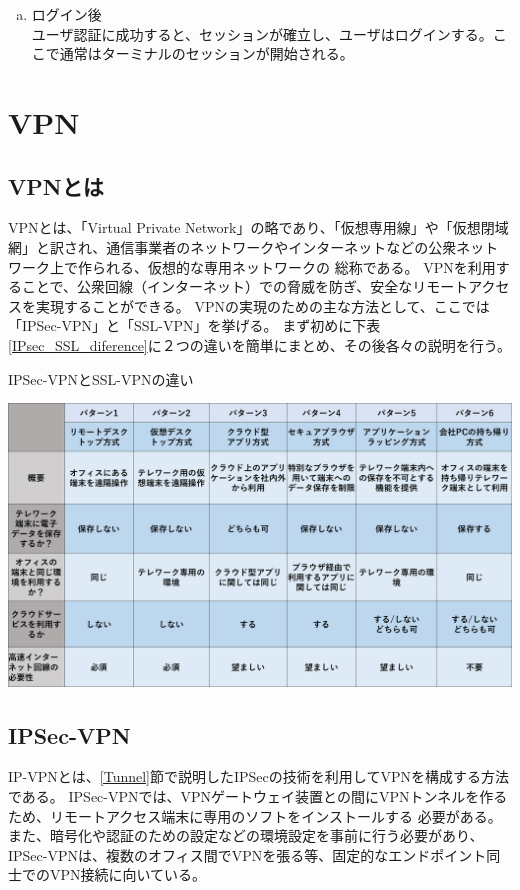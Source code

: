 \documentclass[11pt,a4j,titlepage]{jreport}
\begin{document}
\begin{enumerate}[(a)]
\begin{enumerate}[(1)]
    \end{enumerate}
    \item ログイン後\mbox{}\\
    ユーザ認証に成功すると、セッションが確立し、ユーザはログインする。ここで通常はターミナルのセッションが開始される。
    
\end{enumerate}


\section{VPN}\label{aboutVPN}

\subsection*{VPNとは}
VPNとは、「Virtual Private Network」の略であり、「仮想専用線」や「仮想閉域網」と訳され、通信事業者のネットワークやインターネットなどの公衆ネットワーク上で作られる、仮想的な専用ネットワークの
総称である。
VPNを利用することで、公衆回線（インターネット）での脅威を防ぎ、安全なリモートアクセスを実現することができる。
VPNの実現のための主な方法として、ここでは「IPSec-VPN」と「SSL-VPN」を挙げる。
まず初めに下表\ref{IPsec_SSL_diference}に２つの違いを簡単にまとめ、その後各々の説明を行う。
\begin{table}[h]
    \centering
    \caption{IPSec-VPNとSSL-VPNの違い}
    \includegraphics[width=1.0\textwidth, page=2]{graphs/telework_list.pdf}
    \label{IPsec_SSL_diference}
\end{table}

\subsection{IPSec-VPN}
IP-VPNとは、\ref{Tunnel}節で説明したIPSecの技術を利用してVPNを構成する方法である。
IPSec-VPNでは、VPNゲートウェイ装置との間にVPNトンネルを作るため、リモートアクセス端末に専用のソフトをインストールする
必要がある。また、暗号化や認証のための設定などの環境設定を事前に行う必要があり、
IPSec-VPNは、複数のオフィス間でVPNを張る等、固定的なエンドポイント同士でのVPN接続に向いている。
\end{document}
